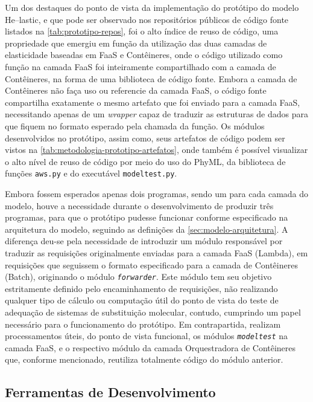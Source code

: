 \documentclass[english,brazilian]{UNISINOSmonografia} %
\begin{document}
Um dos destaques do ponto de vista da implementação do protótipo do modelo \textsf{He}--lastic, e que pode ser observado nos repositórios públicos de código fonte listados na \autoref{tab:prototipo-repos}, foi o alto índice de reuso de código, uma propriedade que emergiu em função da utilização das duas camadas de elasticidade baseadas em FaaS e Contêineres, onde o código utilizado como função na camada FaaS foi inteiramente compartilhado com a camada de Contêineres, na forma de uma biblioteca de código fonte.
%
Embora a camada de Contêineres não faça uso ou referencie da camada FaaS, o código fonte compartilha exatamente o mesmo artefato que foi enviado para a camada FaaS, necessitando apenas de um \textit{wrapper} capaz de traduzir as estruturas de dados para que fiquem no formato esperado pela chamada da função.
%
Os módulos desenvolvidos no protótipo, assim como, seus artefatos de código podem ser vistos na \autoref{tab:metodologia-prototipo-artefatos}, onde também é possível visualizar o alto nível de reuso de código por meio do uso do PhyML, da biblioteca de funções \texttt{aws.py} e do executável \texttt{modeltest.py}.


Embora fossem esperados apenas dois programas, sendo um para cada camada do modelo, houve a necessidade durante o desenvolvimento de produzir três programas, para que o protótipo pudesse funcionar conforme especificado na arquitetura do modelo, seguindo as definições da \autoref{sec:modelo-arquitetura}.
%
A diferença deu-se pela necessidade de introduzir um módulo responsável por traduzir as requisições originalmente enviadas para a camada FaaS (Lambda), em requisições que seguissem o formato especificado para a camada de Contêineres (Batch), originando o módulo \textit{\texttt{forwarder}}.
%
Este módulo tem seu objetivo estritamente definido pelo encaminhamento de requisições, não realizando qualquer tipo de cálculo ou computação útil do ponto de vista do teste de adequação de sistemas de substituição molecular, contudo, cumprindo um papel necessário para o funcionamento do protótipo.
%
Em contrapartida, realizam processamentos úteis, do ponto de vista funcional, os módulos \textit{\texttt{modeltest}} na camada FaaS, e o respectivo módulo da camada Orquestradora de Contêineres que, conforme mencionado, reutiliza totalmente código do módulo anterior.







\subsection{Ferramentas de Desenvolvimento}
\end{document}
